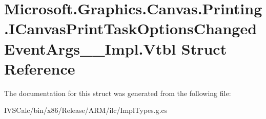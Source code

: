 \hypertarget{struct_microsoft_1_1_graphics_1_1_canvas_1_1_printing_1_1_i_canvas_print_task_options_changed_event_args_____impl_1_1_vtbl}{}\section{Microsoft.\+Graphics.\+Canvas.\+Printing.\+I\+Canvas\+Print\+Task\+Options\+Changed\+Event\+Args\+\_\+\+\_\+\+Impl.\+Vtbl Struct Reference}
\label{struct_microsoft_1_1_graphics_1_1_canvas_1_1_printing_1_1_i_canvas_print_task_options_changed_event_args_____impl_1_1_vtbl}


The documentation for this struct was generated from the following file\+:\begin{DoxyCompactItemize}
\item 
I\+V\+S\+Calc/bin/x86/\+Release/\+A\+R\+M/ilc/Impl\+Types.\+g.\+cs\end{DoxyCompactItemize}
